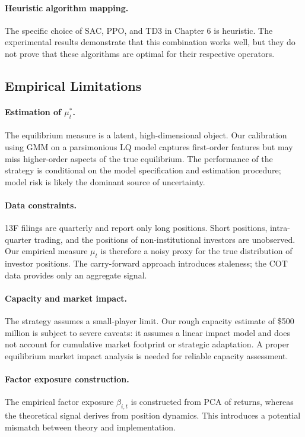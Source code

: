 \paragraph{Heuristic algorithm mapping.} The specific choice of SAC, PPO, and TD3
in Chapter 6 is heuristic. The experimental results demonstrate that this
combination works well, but they do not prove that these algorithms are optimal
for their respective operators.

\subsection{Empirical Limitations}

\paragraph{Estimation of $\mu_t^*$.} The equilibrium measure is a latent,
high-dimensional object. Our calibration using GMM on a parsimonious LQ model
captures first-order features but may miss higher-order aspects of the true
equilibrium. The performance of the strategy is conditional on the model
specification and estimation procedure; model risk is likely the dominant source
of uncertainty.

\paragraph{Data constraints.} 13F filings are quarterly and report only long
positions. Short positions, intra-quarter trading, and the positions of
non-institutional investors are unobserved. Our empirical measure $\mu_t$ is
therefore a noisy proxy for the true distribution of investor positions. The
carry-forward approach introduces staleness; the COT data provides only an
aggregate signal.

\paragraph{Capacity and market impact.} The strategy assumes a small-player
limit. Our rough capacity estimate of \$500 million is subject to severe caveats:
it assumes a linear impact model and does not account for cumulative market
footprint or strategic adaptation. A proper equilibrium market impact analysis is
needed for reliable capacity assessment.

\paragraph{Factor exposure construction.} The empirical factor exposure
$\beta_{i,t}$ is constructed from PCA of returns, whereas the theoretical signal
derives from position dynamics. This introduces a potential mismatch between
theory and implementation.

